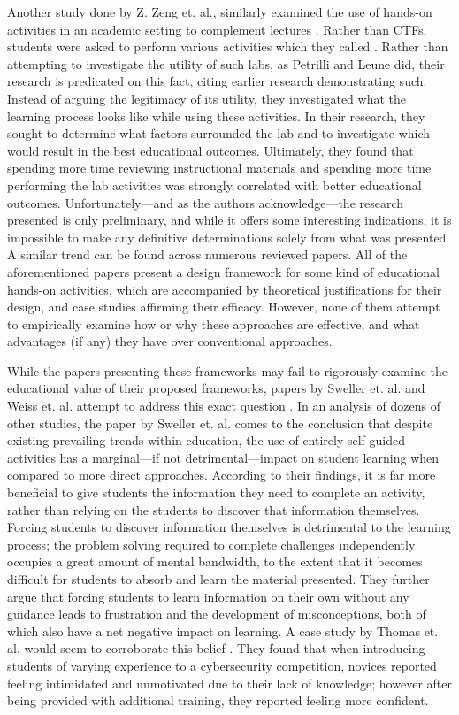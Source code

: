     Another study done by Z. Zeng et. al., similarly examined the use of hands-on activities in an academic setting to complement lectures \cite{Z-Zeng}. Rather than CTFs, students were asked to perform various activities which they called . Rather than attempting to investigate the utility of such labs, as Petrilli and Leune did, their research is predicated on this fact, citing earlier research demonstrating such. Instead of arguing the legitimacy of its utility, they investigated what the learning process looks like while using these activities. In their research, they sought to determine what factors surrounded the lab and to investigate which would result in the best educational outcomes. 
    Ultimately, they found that spending more time reviewing instructional materials and spending more time performing the lab activities was strongly correlated with better educational outcomes. Unfortunately---and as the authors acknowledge---the research presented is only preliminary, and while it offers some interesting indications, it is impossible to make any definitive determinations solely from what was presented. A similar trend can be found across numerous reviewed papers\cite{Y-Deng,W-Du,N-Eliot}. All of the aforementioned papers present a design framework for some kind of educational hands-on activities, which are accompanied by theoretical justifications for their design, and case studies affirming their efficacy. However, none of them attempt to empirically examine how or why these approaches are effective, and what advantages (if any) they have over conventional approaches. 

    While the papers presenting these frameworks may fail to rigorously examine the educational value of their proposed frameworks, papers by Sweller et. al. and Weiss et. al. attempt to address this exact question \cite{J-Sweller,R-Weiss}. In an analysis of dozens of other studies, the paper by Sweller et. al. comes to the conclusion that despite existing prevailing trends within education, the use of entirely self-guided activities has a marginal---if not detrimental---impact on student learning when compared to more direct approaches. According to their findings, it is far more beneficial to give students the information they need to complete an activity, rather than relying on the students to discover that information themselves. Forcing students to discover information themselves is detrimental to the learning process; the problem solving required to complete challenges independently occupies a great amount of mental bandwidth, to the extent that it becomes difficult for students to absorb and learn the material presented. They further argue that forcing students to learn information on their own without any guidance leads to frustration and the development of misconceptions, both of which also have a net negative impact on learning. A case study by Thomas et. al. would seem to corroborate this belief \cite{L-Thomas}. They found that when introducing students of varying experience to a cybersecurity competition, novices reported feeling intimidated and unmotivated due to their lack of knowledge; however after being provided with additional training, they reported feeling more confident. 

